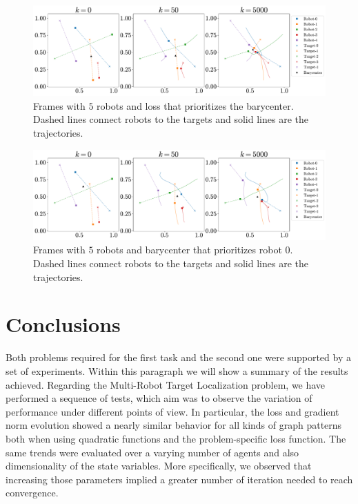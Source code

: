 \documentclass[a4paper,11pt,oneside]{book}
\begin{document}
\begin{figure}[H]
      \centering
      \includegraphics[width=0.9\linewidth]{./figs/aggregative/barycenter_anim/anim.pdf} 
      \caption{Frames with $5$ robots and loss that prioritizes the barycenter. Dashed lines connect robots to the targets and solid lines are the trajectories.}
      \label{fig:anim_barycenter}
\end{figure}

\begin{figure}[H]
      \centering
      \includegraphics[width=0.9\linewidth]{./figs/aggregative/importance_anim/anim.pdf} 
      \caption{Frames with $5$ robots and barycenter that prioritizes robot $0$. Dashed lines connect robots to the targets and solid lines are the trajectories.}
      \label{fig:anim_importance}
\end{figure}



\chapter*{Conclusions}

Both problems required for the first task and the second one were supported by a set of experiments. Within this paragraph we will show a summary of the results achieved.
Regarding the Multi-Robot Target Localization problem, we have performed a sequence of tests, which aim was to observe the variation of performance under different points of view. In particular, the loss and gradient norm evolution showed a nearly similar behavior for all kinds of graph patterns both when using quadratic functions and the problem-specific loss function.
The same trends were evaluated over a varying number of agents and also dimensionality of the state variables. More specifically, we observed that increasing those parameters implied a greater number of iteration needed to reach convergence. 




\end{document}
